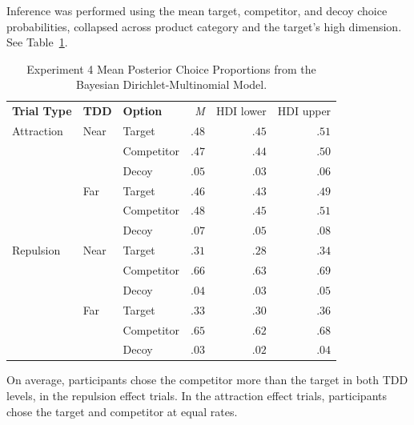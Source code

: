 Inference was performed using the mean target, competitor, and decoy choice probabilities, collapsed across product category and the target's high dimension. See Table~\ref{tab:e4_choice_params}.

\begin{table}[ht]
    \centering
    \begin{tabular}{lllrrr}
        \toprule
        \textbf{Trial Type} & \textbf{TDD} & \textbf{Option} & \textit{M} & HDI lower & HDI upper \\
        Attraction          & Near         & Target          &  $.48$     & $.45$     & $.51$     \\
                            &              & Competitor      &  $.47$     & $.44$     & $.50$     \\
                            &              & Decoy           &  $.05$     & $.03$     & $.06$     \\
                            & Far          & Target          &  $.46$     & $.43$     & $.49$     \\
                            &              & Competitor      &  $.48$     & $.45$     & $.51$     \\
                            &              & Decoy           &  $.07$     & $.05$     & $.08$     \\
        Repulsion           & Near         & Target          &  $.31$     & $.28$     & $.34$     \\
                            &              & Competitor      &  $.66$     & $.63$     & $.69$     \\
                            &              & Decoy           &  $.04$     & $.03$     & $.05$     \\
                            & Far          & Target          &  $.33$     & $.30$     & $.36$     \\
                            &              & Competitor      &  $.65$     & $.62$     & $.68$     \\
                            &              & Decoy           &  $.03$     & $.02$     & $.04$     \\
        \bottomrule
    \end{tabular}
    \caption{Experiment 4 Mean Posterior Choice Proportions from the Bayesian Dirichlet-Multinomial Model.}
    \label{tab:e4_choice_params}
\end{table}

On average, participants chose the competitor more than the target in both TDD levels, in the repulsion effect trials. In the attraction effect trials, participants chose the target and competitor at equal rates. 

